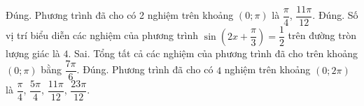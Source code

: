 \begin{ex}
{\begin{center}
 \end{center}
 \begin{itemchoice}
  \itemch Đúng. Phương trình đã cho có 2 nghiệm trên khoảng  $(0; \pi)$ là $\dfrac{\pi}{4}$, $\dfrac{11 \pi}{12}$.
  \itemch Đúng.  Số vị trí biểu diễn các nghiệm của phương trình $\sin \left(2 x+\dfrac{\pi}{3}\right)=\dfrac{1}{2}$ trên đường tròn lượng giác là $4$.
  \itemch Sai. Tổng tất cả các nghiệm của phương trình đã  cho trên khoảng $(0; \pi)$ bằng $\dfrac{7 \pi}{6}$.
  \itemch Đúng. Phương trình đã cho có $4$ nghiệm trên khoảng  $(0; 2 \pi)$ là $\dfrac{\pi}{4}$, $\dfrac{5 \pi}{4}$, $\dfrac{11 \pi}{12}$, $\dfrac{23 \pi}{12}$.
 \end{itemchoice}
 }
\end{ex}

